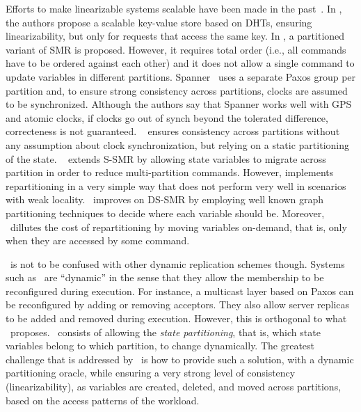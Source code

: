 Efforts to make linearizable systems scalable have been made in the past~\cite{corbett2013spanner, bezerra2014ssmr, hoang2016, Glendenning2011, Marandi11}.
In \cite{Glendenning2011}, the authors propose a scalable key-value store based on DHTs, ensuring linearizability, but only for requests that access the same key. 
In \cite{Marandi11}, a partitioned variant of SMR is proposed.
However, it requires total order (i.e., all commands have to be ordered against each other) and it does not allow a single command to update variables in different partitions.
Spanner~\cite{corbett2013spanner} uses a separate Paxos group per partition and, to ensure strong consistency across partitions, clocks are assumed to be synchronized.
Although the authors say that Spanner works well with GPS and atomic clocks, if clocks go out of synch beyond the tolerated difference, correcteness is not guaranteed.
\ssmr{}~\cite{bezerra2014ssmr} ensures consistency across partitions without any assumption about clock synchronization, but relying on a static partitioning of the state.
\dssmr{}~\cite{hoang2016} extends S-SMR by allowing state variables to migrate across partition in order to reduce multi-partition commands.
However, \dssmr{} implements repartitioning in a very simple way that does not perform very well in scenarios with weak locality.
\dynastar\ improves on DS-SMR by employing well known graph partitioning techniques to decide where each variable should be.
Moreover, \dynastar\ dillutes the cost of repartitioning by moving variables on-demand, that is, only when they are accessed by some command.

\dynastar\ is not to be confused with other dynamic replication schemes though.
Systems such as~\cite{birman2010dsr,guessoum2003dar,dustdar2007soc} are ``dynamic'' in the sense that they allow the membership to be reconfigured during execution.
For instance, a multicast layer based on Paxos can be reconfigured by adding or removing acceptors. They also allow server replicas to be added and removed during execution.
However, this is orthogonal to what \dynastar\ proposes.
\dynastar\ consists of allowing the \emph{state partitioning}, that is, which state variables belong to which partition, to change dynamically.
The greatest challenge that is addressed by \dynastar\ is how to provide such a solution, with a dynamic partitioning oracle, while ensuring a very strong level of consistency (linearizability), as variables are created, deleted, and moved across partitions, based on the access patterns of the workload.

